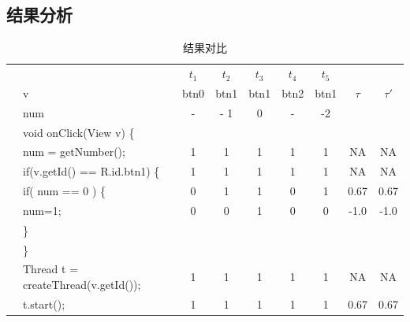 \subsection{结果分析}

\begin{table}[!ht]
	
	\caption{结果对比}

	
	\label{tab:result}
	\begin{center}
		\scriptsize	
		
		
		
		\begin{tabular}{|rl*{5} {|c}|c|c|}
			
						\hline
			
			&                    & $t_1$ & $t_2$ & $t_3$ & $t_4$ & $t_5$ & ~&  ~\\
			&v &btn0& btn1& btn1& btn2 &btn1 & $\tau$ &  $\tau'$   \\
			&num&   - & - 1& 0& -& -2& &\\
			\hline
			
			&void onClick(View v) \{                       &   &   &   &   &   &      &         \\
			
			&\quad num = getNumber();                   & 1 & 1 & 1 & 1 & 1 &  NA  &  NA    \\
			
			&\quad if(v.getId() == R.id.btn1) \{           & 1 & 1 & 1 & 1 & 1 &  NA    &  NA \\
			
			&\quad \quad if( num == 0 ) \{                    & 0 & 1 & 1 & 0 & 1 & 0.67   & 0.67 \\
			
			&\quad \quad \quad num=1;                         & 0 & 0 & 1 & 0 & 0 & -1.0  &-1.0\\
			
			&\quad \quad \}                                   &   &   &   &   &   &       &            \\
			
			&\quad   \}                                       &   &   &   &   &   &      &            \\
			
			&\quad Thread t = createThread(v.getId());          & 1 & 1 & 1 & 1 & 1 & NA&  NA  \\
			
			&\quad t.start();                                 & 1 & 1 & 1 & 1 & 1 & 0.67   & 0.67 \\
			

\end{tabular}
\end{center}
\end{table}
